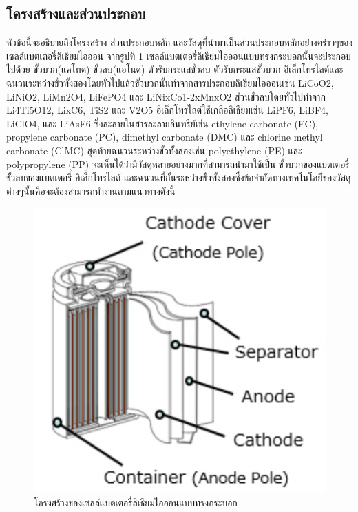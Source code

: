 \subsection{โครงสร้างและส่วนประกอบ}
หัวข้อนี้จะอธิบายถึงโครงสร้าง ส่วนประกอบหลัก และวัสดุที่นำมาเป็นส่วนประกอบหลักอย่างคร่าวๆของเซลล์แบตเตอรี่ลิเธียมไอออน จากรูปที่ 1 เซลล์แบตเตอรี่ลิเธียมไอออนแบบทรงกระบอกนั้นจะประกอบไปด้วย ขั้วบวก(แคโทด) ขั้วลบ(แอโนด) ตัวรับกระแสขั้วลบ  ตัวรับกระแสขั้วบวก อิเล็กโทรไลต์และฉนวนระหว่างขั้วทั้งสองโดยทั่วไปแล้วขั้วบวกนั้นทำจากสารประกอบลิเธียมไอออนเช่น LiCoO2, LiNiO2, LiMn2O4, LiFePO4 และ LiNixCo1-2xMnxO2 ส่วนขั้วลบโดยทั่วไปทำจาก Li4Ti5O12, LixC6, TiS2 และ V2O5 อิเล็กโทรไลต์ใช้เกลือลิเธียมเช่น LiPF6, LiBF4, LiClO4, และ LiAsF6 ซึ่งละลายในสารละลายอินทรีย์เช่น ethylene carbonate (EC), propylene carbonate (PC), dimethyl carbonate (DMC) และ chlorine methyl carbonate (ClMC) สุดท้ายฉนวนระหว่างขั้วทั้งสองเช่น polyethylene (PE) และ polypropylene (PP) จะเห็นได้ว่ามีวัสดุหลายอย่างมากที่สามารถนำมาใช้เป็น ขั้วบวกของแบตเตอรี่ ขั้วลบของแบตเตอรี่ อิเล็กโทรไลต์ และฉนวนที่กั้นระหว่างขั้วทั้งสองซึ่งข้อจำกัดทางเทคโนโลยีของวัสดุต่างๆนั้นคือจะต้องสามารถทำงานตามแนวทางดังนี้
\begin{center}
	\begin{figure}[!h]
		\includegraphics[width=0.4\linewidth]{Chapters/img/Cyrinder_battery.pdf}
		\centering
		\captionsetup{justification=centering,margin=2cm}
		\caption{โครงสร้างของเซลล์แบตเตอรี่ลิเธียมไอออนแบบทรงกระบอก}
	\end{figure}
\end{center}
